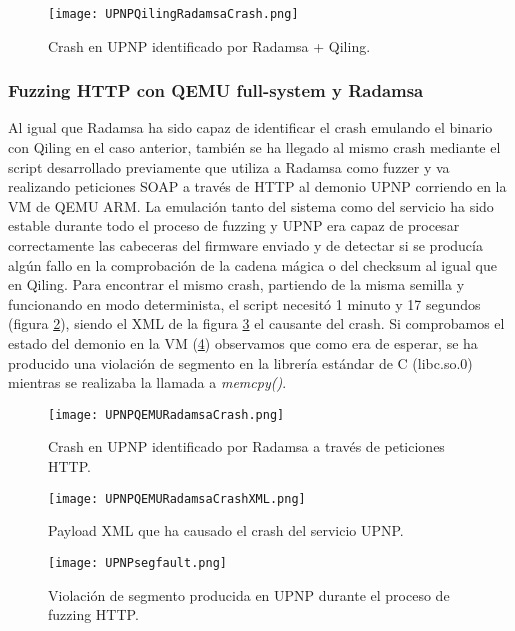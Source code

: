 \begin{figure}[H]
    \centering
    \texttt{[image: UPNPQilingRadamsaCrash.png]}
    \caption{Crash en UPNP identificado por Radamsa + Qiling.}
    \label{fig:UPNPQilingRadamsaCrash}
\end{figure}

\subsubsection{Fuzzing HTTP con QEMU full-system y Radamsa}
Al igual que Radamsa ha sido capaz de identificar el crash emulando el binario con Qiling en el caso anterior, también se ha llegado al mismo 
crash mediante el script desarrollado previamente que utiliza a Radamsa como fuzzer y va realizando peticiones SOAP a través de HTTP al 
demonio UPNP corriendo en la VM de QEMU ARM. La emulación tanto del sistema como del servicio ha sido estable durante todo el proceso de
fuzzing y UPNP era capaz de procesar correctamente las cabeceras del firmware enviado y de detectar si se producía algún fallo en la comprobación
de la cadena mágica o del checksum al igual que en Qiling. Para encontrar el mismo crash, partiendo de la misma semilla y funcionando en modo 
determinista, el script necesitó 1 minuto y 17 segundos (figura \ref{fig:UPNPQEMURadamsaCrash}), siendo el XML de la figura \ref{fig:UPNPQEMURadamsaCrashXML}
el causante del crash. Si comprobamos el estado del demonio en la VM (\ref{fig:UPNPsegfault}) observamos que como era de esperar, se ha producido una violación de segmento
en la librería estándar de C (libc.so.0) mientras se realizaba la llamada a \textit{memcpy()}.

\begin{figure}[H]
    \centering
    \texttt{[image: UPNPQEMURadamsaCrash.png]}
    \caption{Crash en UPNP identificado por Radamsa a través de peticiones HTTP.}
    \label{fig:UPNPQEMURadamsaCrash}
\end{figure}

\begin{figure}[H]
    \centering
    \texttt{[image: UPNPQEMURadamsaCrashXML.png]}
    \caption{Payload XML que ha causado el crash del servicio UPNP.}
    \label{fig:UPNPQEMURadamsaCrashXML}
\end{figure}

\begin{figure}[H]
    \centering
    \texttt{[image: UPNPsegfault.png]}
    \caption{Violación de segmento producida en UPNP durante el proceso de fuzzing HTTP.}
    \label{fig:UPNPsegfault}
\end{figure}

